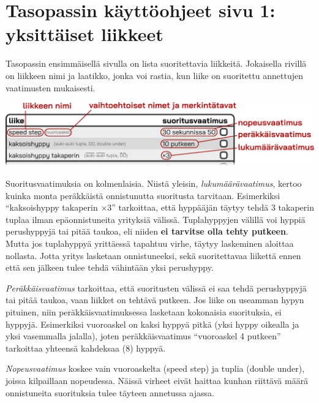 \documentclass{article}
\begin{document}
\section*{Tasopassin käyttöohjeet sivu 1: yksittäiset liikkeet}
Tasopassin ensimmäisellä sivulla on lista suoritettavia liikkeitä. Jokaisella
rivillä on liikkeen nimi ja laatikko, jonka voi rastia, kun liike on suoritettu
annettujen vaatimusten mukaisesti.
\vspace*{-.5em}
\begin{center}
	\includegraphics[scale=.75]{skill_table_example.pdf}
\end{center}
\vspace*{-.5em}
Suoritusvaatimuksia on kolmenlaisia. Niistä yleisin, \emph{lukumäärävaatimus},
kertoo kuinka monta peräkkäistä onnistunutta suoritusta tarvitaan.  Esimerkiksi
``kaksoishyppy takaperin ×3'' tarkoittaa, että hyppääjän täytyy tehdä 3
takaperin tuplaa ilman epäonnistuneita yrityksiä välissä. Tuplahyppyjen välillä
voi hyppiä perushyppyjä tai pitää taukoa, eli niiden \textbf{ei tarvitse olla
tehty putkeen}. Mutta jos tuplahyppyä yrittäessä tapahtuu virhe, täytyy
laskeminen aloittaa nollasta. Jotta yritys lasketaan onnistuneeksi, sekä
suoritettavaa liikettä ennen että sen jälkeen tulee tehdä vähintään yksi
perushyppy.

\emph{Peräkkäisvaatimus} tarkoittaa, että suoritusten välissä ei saa tehdä
perushyppyjä tai pitää taukoa, vaan liikket on tehtävä putkeen. Jos liike on
useamman hypyn pituinen, niin peräkkäisvaatimuksessa lasketaan kokonaisia
suorituksia, ei hyppyjä. Esimerkiksi vuoroaskel on kaksi hyppyä pitkä (yksi
hyppy oikealla ja yksi vasemmalla jalalla), joten peräkkäisvaatimus ``vuoroaskel
4 putkeen'' tarkoittaa yhteensä kahdeksaa (8) hyppyä.

\emph{Nopeusvaatimus} koskee vain vuoroaskelta (speed step) ja tuplia (double
under), joissa kilpaillaan nopeudessa. Näissä virheet eivät haittaa kunhan
riittävä määrä onnistuneita suorituksia tulee täyteen annetussa ajassa.
\end{document}
